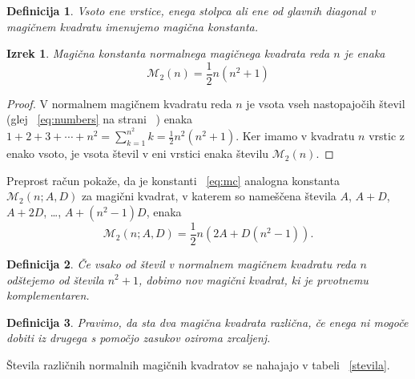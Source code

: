 \documentclass[a4paper,12pt]{article}
\newtheorem{izrek}{Izrek}
\newtheorem{definicija}{Definicija}
\newcommand{\m}{\mathcal{M}}
\begin{document}
\begin{definicija}
      Vsoto ene vrstice, enega stolpca ali ene od glavnih diagonal
      v magičnem kvadratu imenujemo \emph{magična konstanta}.
\end{definicija}

\begin{izrek}
   Magična konstanta normalnega magičnega kvadrata reda \(n\)
   je enaka
   \begin{equation}
      \label{eq:mc}
      \m_2(n) = \frac{1}{2}n(n^2 + 1)
   \end{equation}
\end{izrek}   

\begin{proof}
   V normalnem magičnem kvadratu reda \(n\) je vsota vseh nastopajočih
   števil (glej ~\eqref{eq:numbers} na strani ~\pageref{eq:numbers}) enaka \(1+2+3+\cdots+n^2=\sum_{k=1}^{n^2} k= \frac{1}{2}n^2(n^2 + 1)\). Ker imamo
   v kvadratu \(n\) vrstic z enako vsoto, je vsota števil v eni vrstici
   enaka številu \(\m_2(n)\). %
\end{proof}

Preprost račun pokaže, da je konstanti ~\eqref{eq:mc} analogna konstanta
\(\m_2(n;A,D)\) za magični kvadrat, v katerem so nameščena števila
\(A\), \(A+D\), \(A+2D\), \ldots, \(A+(n^2-1)D\), enaka %
\[
\m_2(n;A,D) = \frac{1}{2}n (2A + D(n^2 - 1)).
\]

\begin{definicija}
      Če vsako od števil v normalnem magičnem kvadratu reda \(n\) odštejemo
      od števila \(n^2 + 1\), dobimo nov magični kvadrat, ki je prvotnemu
      \emph{komplementaren}.
\end{definicija}

\begin{definicija}
      Pravimo, da sta dva magična kvadrata \emph{različna}, če enega ni mogoče dobiti
      iz drugega s pomočjo zasukov oziroma zrcaljenj.
\end{definicija}

Števila različnih normalnih magičnih kvadratov se nahajajo v tabeli ~\ref{stevila}.
\end{document}
